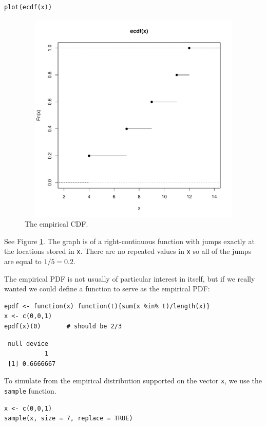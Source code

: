 \documentclass[captions=tableheading]{scrbook}
\begin{document}
\begin{verbatim}
plot(ecdf(x))
\end{verbatim}



\begin{figure}[th]
    \includegraphics[width=5in, height=4in]{img/empirical-CDF.pdf}
    \caption[The empirical CDF]{\small The empirical CDF.}
    \label{fig:empirical-CDF}
  \end{figure}

See Figure \ref{fig:empirical-CDF}. The graph is of a right-continuous function with jumps exactly at the locations stored in \texttt{x}. There are no repeated values in \texttt{x} so all of the jumps are equal to \(1/5=0.2\).

The empirical PDF is not usually of particular interest in itself, but if we really wanted we could define a function to serve as the empirical PDF:


\begin{verbatim}
epdf <- function(x) function(t){sum(x %in% t)/length(x)}
x <- c(0,0,1)
epdf(x)(0)       # should be 2/3
\end{verbatim}

\begin{verbatim}
 null device 
           1
 [1] 0.6666667
\end{verbatim}

To simulate from the empirical distribution supported on the vector \texttt{x}, we use the \texttt{sample} function.


\begin{verbatim}
x <- c(0,0,1)
sample(x, size = 7, replace = TRUE)
\end{verbatim}
\end{document}
